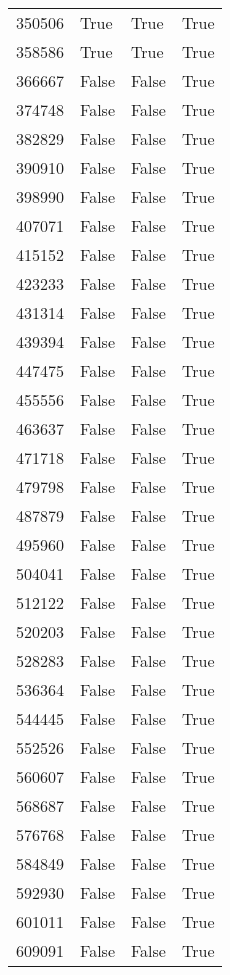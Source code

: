 \begin{tabular}{llll}
350506 &    True &    True &    True \\
358586 &    True &    True &    True \\
366667 &   False &   False &    True \\
374748 &   False &   False &    True \\
382829 &   False &   False &    True \\
390910 &   False &   False &    True \\
398990 &   False &   False &    True \\
407071 &   False &   False &    True \\
415152 &   False &   False &    True \\
423233 &   False &   False &    True \\
431314 &   False &   False &    True \\
439394 &   False &   False &    True \\
447475 &   False &   False &    True \\
455556 &   False &   False &    True \\
463637 &   False &   False &    True \\
471718 &   False &   False &    True \\
479798 &   False &   False &    True \\
487879 &   False &   False &    True \\
495960 &   False &   False &    True \\
504041 &   False &   False &    True \\
512122 &   False &   False &    True \\
520203 &   False &   False &    True \\
528283 &   False &   False &    True \\
536364 &   False &   False &    True \\
544445 &   False &   False &    True \\
552526 &   False &   False &    True \\
560607 &   False &   False &    True \\
568687 &   False &   False &    True \\
576768 &   False &   False &    True \\
584849 &   False &   False &    True \\
592930 &   False &   False &    True \\
601011 &   False &   False &    True \\
609091 &   False &   False &    True \\

\end{tabular}
